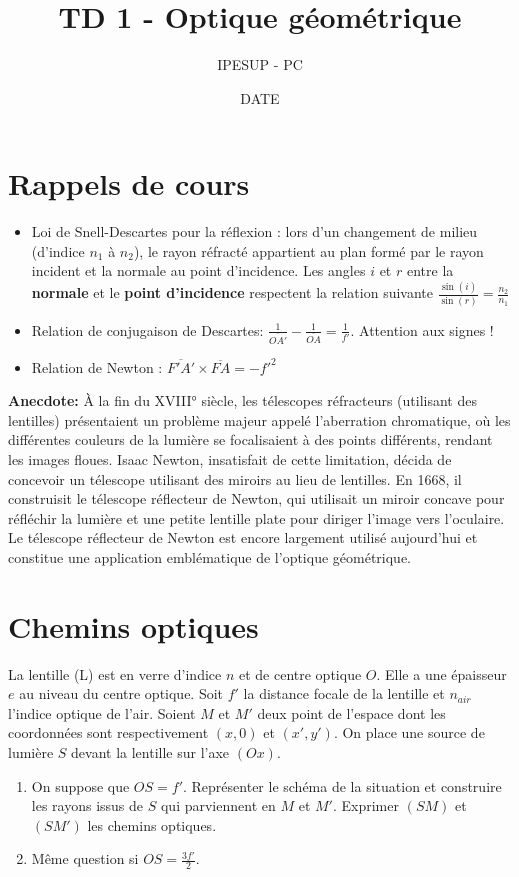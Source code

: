 \documentclass{article}
\title{TD 1 - Optique géométrique }
\author{IPESUP - PC }
\date{DATE }
\begin{document}
\maketitle



\section{Rappels de cours}

\begin{itemize}
  \item Loi de Snell-Descartes pour la réflexion : lors d'un changement de milieu (d'indice $n_1$ à $n_2$), le rayon réfracté appartient au plan formé par le rayon incident et la normale au point d'incidence. Les angles $i$ et $r$ entre la \textbf{normale} et le \textbf{point d'incidence} respectent la relation suivante $\frac{\sin(i)}{\sin(r)} = \frac{n_2}{n_1}$
  \item Relation de conjugaison de Descartes: $\frac{1}{\overline{OA'} } - \frac{1}{\overline{OA} } = \frac{1}{f'}$. Attention aux signes ! 
  \item Relation de Newton : $\overline{F'A'} \times \overline{FA} = -f'^2$
\end{itemize}

\textbf{Anecdote: }À la fin du XVIII° siècle, les télescopes réfracteurs (utilisant des lentilles) présentaient un problème majeur appelé l'aberration chromatique, où les différentes couleurs de la lumière se focalisaient à des points différents, rendant les images floues. Isaac Newton, insatisfait de cette limitation, décida de concevoir un télescope utilisant des miroirs au lieu de lentilles. En 1668, il construisit le télescope réflecteur de Newton, qui utilisait un miroir concave pour réfléchir la lumière et une petite lentille plate pour diriger l'image vers l'oculaire.
Le télescope réflecteur de Newton est encore largement utilisé aujourd'hui et constitue une application emblématique de l'optique géométrique. 
\section{Chemins optiques}

La lentille (L) est en verre d'indice $n$ et de centre optique $O$.
Elle a une épaisseur $e$ au niveau du centre optique. 
Soit $f'$ la distance focale de la lentille et $n_{air}$ l'indice optique de l'air.
Soient $M$ et $M'$ deux point de l'espace dont les coordonnées sont respectivement $(x,0)$ et $(x',y')$.
On place une source de lumière $S$ devant la lentille sur l'axe $(Ox)$. 
\begin{enumerate}
  \item On suppose que $OS=f'$. Représenter le schéma de la situation et construire les rayons issus de $S$ qui parviennent en $M$ et $M'$. Exprimer $(SM)$ et $(SM')$ les chemins optiques. 
  \item Même question si $OS=\frac{3f'}{2}$.
\end{enumerate}
\end{document}
